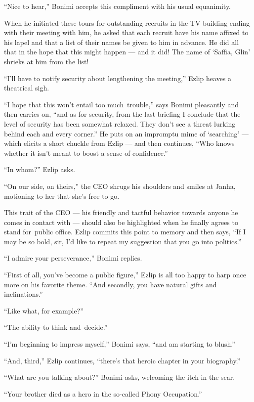 \documentclass[twoside,11pt,openany]{book}
\begin{document}
``Nice to hear,'' Bonimi accepts this compliment with his usual equanimity.

When he initiated these tours for outstanding recruits in the TV building ending with their meeting with him, he
asked that each recruit have his name affixed to his lapel and that a list of their names be given to him in advance.
He did all that in the hope that this might  happen --- and{ }it did! The name
of `Saffia, Glin' shrieks at him from the list!

``I'll have to notify security about lengthening the meeting,'' Ezlip heaves a theatrical
sigh.

``I hope that this won't entail too much~trouble,'' says Bonimi pleasantly and then carries
on, ``and as for security, from the last briefing I conclude that the level of security has been
somewhat relaxed. They don't see a threat lurking behind each and every corner.'' He puts on an impromptu
mime of `searching' --- which elicits a short chuckle from Ezlip --- and then continues, ``Who knows
whether it isn't meant to boost a sense of confidence.''

``In whom?'' Ezlip asks.

``On our side, on theirs,'' the CEO shrugs his shoulders and smiles
at Janha, motioning to her that she's free to go.

This trait of the CEO --- his friendly and tactful behavior towards anyone he comes in contact with --- should also be
highlighted when he finally agrees to stand for~public office.  Ezlip commits this point to memory and then says,
``If I may be so bold, sir, I'd like to repeat my suggestion that you go into politics.''

``I admire your perseverance,'' Bonimi replies.

``First of all, you've become a public figure,'' Ezlip is all too happy to harp once more
on his favorite theme. ``And secondly, you have natural gifts and inclinations.''

``Like what, for example?''

``The ability to think and~decide.''

``I'm beginning to impress myself,'' Bonimi says, ``and am starting to
blush.''

``And, third,'' Ezlip continues, ``there's that heroic chapter in your
biography.''

``What are you talking about?'' Bonimi asks, welcoming the itch in the scar.

``Your brother died as a hero in the so-called Phony Occupation.''
\end{document}
